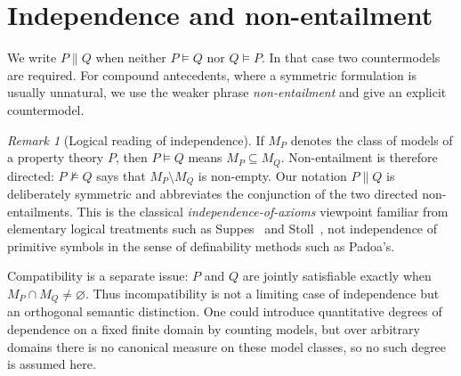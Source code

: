 \documentclass[11pt,a4paper,reqno]{amsart}
\theoremstyle{definition}
\theoremstyle{remark}
\newtheorem{remark}[proposition]{Remark}
\begin{document}
\section{Independence and non-entailment}\label{sec:independence}

We write $P\parallel Q$ when neither $P\models Q$ nor $Q\models P$.  In that
case two countermodels are required.  For compound antecedents, where a
symmetric formulation is usually unnatural, we use the weaker phrase
\emph{non-entailment} and give an explicit countermodel.

\begin{remark}[Logical reading of independence]\label{rem:logical-independence}
If $M_P$ denotes the class of models of a property theory $P$, then
$P\models Q$ means $M_P\subseteq M_Q$.  Non-entailment is therefore directed:
$P\not\models Q$ says that $M_P\setminus M_Q$ is non-empty.  Our notation
$P\parallel Q$ is deliberately symmetric and abbreviates the conjunction of
the two directed non-entailments.  This is the classical
\emph{independence-of-axioms} viewpoint familiar from elementary logical
treatments such as Suppes~\cite{Suppes1957} and Stoll~\cite{Stoll1963}, not
independence of primitive symbols in the sense of definability methods such as
Padoa's.

Compatibility is a separate issue: $P$ and $Q$ are jointly satisfiable exactly
when $M_P\cap M_Q\neq\varnothing$.  Thus incompatibility is not a limiting
case of independence but an orthogonal semantic distinction.  One could
introduce quantitative degrees of dependence on a fixed finite domain by
counting models, but over arbitrary domains there is no canonical measure on
these model classes, so no such degree is assumed here.
\end{remark}
\end{document}
